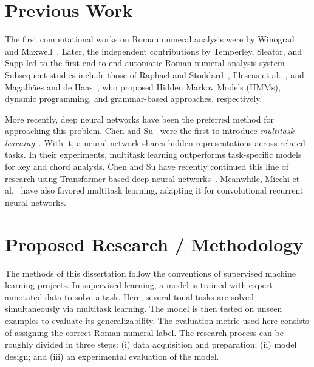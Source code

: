 \documentclass[12pt]{article}
\newcommand{\guide}[1]{}
\begin{document}
\section*{Previous Work}

\guide{Historical}
The first computational works on Roman numeral analysis were by Winograd~\cite{winograd_linguistics_1968} and Maxwell~\cite{maxwell_expert_1992}.
Later, the independent contributions by Temperley, Sleator, and Sapp led to the first end-to-end automatic Roman numeral analysis system~\cite{temperley_cognition_2004, sleator_melisma_2003, sapp_tsroot_2009}.
Subsequent studies include those of Raphael and Stoddard~\cite{raphael_functional_2004}, Illescas et al.~\cite{illescas_harmonic_2007}, and Magalh\~aes and de Haas~\cite{magalhaes_functional_2011}, who proposed Hidden Markov Models (HMMs), dynamic programming, and grammar-based approaches, respectively.

\guide{Nowadays}
More recently, deep neural networks have been the preferred method for approaching this problem.
Chen and Su~\cite{chen_functional_2018} were the first to introduce \emph{multitask learning}~\cite{ruder_overview_2017}.
With it, a neural network shares hidden representations across related tasks.
In their experiments, multitask learning outperforms task-specific models for key and chord analysis.
Chen and Su have recently continued this line of research using Transformer-based deep neural networks~\cite{chen_attend_2021}.
Meanwhile, Micchi et al.~\cite{micchi_not_2020} have also favored multitask learning, adapting it for convolutional recurrent neural networks.


\section*{Proposed Research / Methodology}

The methods of this dissertation follow the conventions of supervised machine learning projects.
In supervised learning, a model is trained with expert-annotated data to solve a task.
Here, several tonal tasks are solved simultaneously via multitask learning.
The model is then tested on unseen examples to evaluate its generalizability.
The evaluation metric used here consists of assigning the correct Roman numeral label.
The research process can be roughly divided in three steps:
(i) data acquisition and preparation;
(ii) model design;
and (iii) an experimental evaluation of the model.
\end{document}
